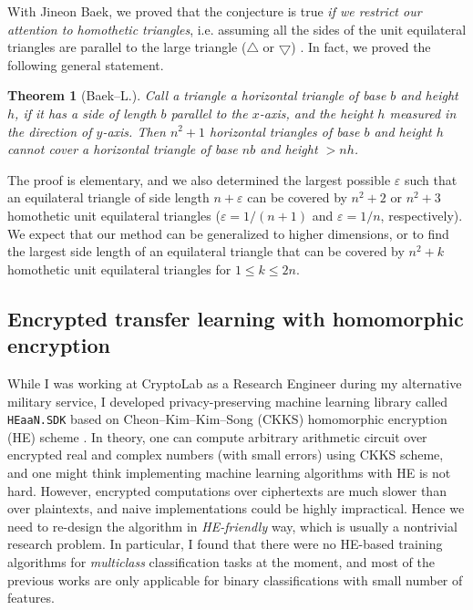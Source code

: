 \documentclass[12pt]{article}
\newtheorem*{theorem*}{Theorem}
\begin{document}
With Jineon Baek, we proved that the conjecture is true \emph{if we restrict our attention to homothetic triangles}, i.e. assuming all the sides of the unit equilateral triangles are parallel to the large triangle ($\bigtriangleup$ or $\bigtriangledown$) \cite{baek2024n2}.
In fact, we proved the following general statement.

\begin{theorem*}[Baek--L.]
Call a triangle a horizontal triangle of base $b$ and height $h$, if it has a side of length $b$ parallel to the $x$-axis, and the height $h$ measured in the direction of $y$-axis.
Then $n^2 + 1$ horizontal triangles of base $b$ and height $h$ cannot cover a horizontal triangle of base $nb$ and height $> nh$.
\end{theorem*}

The proof is elementary, and we also determined the largest possible $\varepsilon$ such that an equilateral triangle of side length $n + \varepsilon$ can be covered by $n^2 + 2$ or $n^2 + 3$ homothetic unit equilateral triangles ($\varepsilon = 1/(n+1)$ and $\varepsilon = 1 / n$, respectively). 
We expect that our method can be generalized to higher dimensions, or to find the largest side length of an equilateral triangle that can be covered by $n^2 + k$ homothetic unit equilateral triangles for $1 \le k \le 2n$.

\subsection*{Encrypted transfer learning with homomorphic encryption}

While I was working at CryptoLab as a Research Engineer during my alternative military service, I developed privacy-preserving machine learning library called \texttt{HEaaN.SDK} \cite{heaansdk} based on Cheon--Kim--Kim--Song (CKKS) homomorphic encryption (HE) scheme \cite{cheon2017homomorphic}.
In theory, one can compute arbitrary arithmetic circuit over encrypted real and complex numbers (with small errors) using CKKS scheme, and one might think implementing machine learning algorithms with HE is not hard.
However, encrypted computations over ciphertexts are much slower than over plaintexts, and naive implementations could be highly impractical.
Hence we need to re-design the algorithm in \emph{HE-friendly} way, which is usually a nontrivial research problem.
In particular, I found that there were no HE-based training algorithms for \emph{multiclass} classification tasks at the moment, and most of the previous works are only applicable for binary classifications with small number of features.
\end{document}
